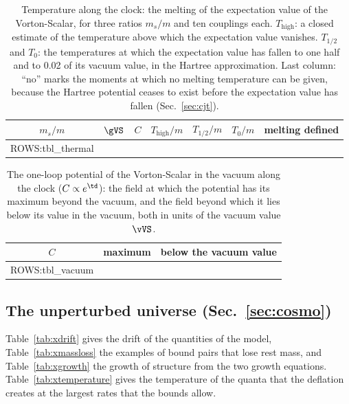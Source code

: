 \begin{table}
\caption{\label{tab:xthermal}Temperature along the clock: the melting of the expectation value of the
Vorton-Scalar, for three ratios $m_s/m$ and ten couplings each. $T_{\mathrm{high}}$: a closed estimate
of the temperature above which the expectation value vanishes. $T_{1/2}$ and $T_0$: the temperatures
at which the expectation value has fallen to one half and to 0.02 of its vacuum value, in the Hartree
approximation. Last column: ``no'' marks the moments at which no melting temperature can be given,
because the Hartree potential ceases to exist before the expectation value has fallen
(Sec.~\ref{sec:cjt}).}
\begin{ruledtabular}
\begin{tabular}{ccccccc}
$m_s/m$ & $\gVS$ & $C$ & $T_{\mathrm{high}}/m$ & $T_{1/2}/m$ & $T_0/m$ & melting defined \\
\hline
{{ROWS:tbl_thermal}}
\end{tabular}
\end{ruledtabular}
\end{table}

\begin{table}
\caption{\label{tab:xvacuum}The one-loop potential of the Vorton-Scalar in the vacuum along the clock
($C\propto e^{\td}$): the field at which the potential has its maximum beyond the vacuum, and the
field beyond which it lies below its value in the vacuum, both in units of the vacuum value $\vVS$.}
\begin{ruledtabular}
\begin{tabular}{ccc}
$C$ & maximum & below the vacuum value \\
\hline
{{ROWS:tbl_vacuum}}
\end{tabular}
\end{ruledtabular}
\end{table}

\subsection{The unperturbed universe (Sec.~\ref{sec:cosmo})}

Table~\ref{tab:xdrift} gives the drift of the quantities of the model, Table~\ref{tab:xmassloss} the
examples of bound pairs that lose rest mass, and Table~\ref{tab:xgrowth} the growth of structure from
the two growth equations.
Table~\ref{tab:xtemperature} gives the temperature of the quanta that the deflation creates at the
largest rates that the bounds allow.

